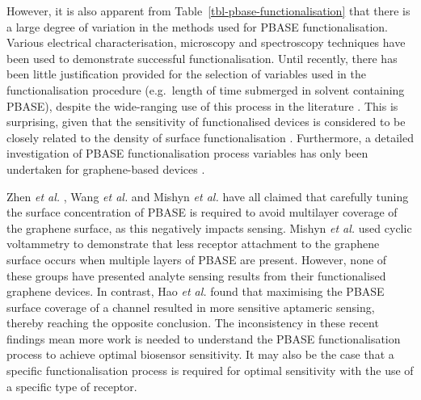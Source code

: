 \documentclass[
  a4paper,
]{scrbook}
\begin{document}
However, it is also apparent from
Table~\ref{tbl-pbase-functionalisation} that there is a large degree of
variation in the methods used for PBASE functionalisation. Various
electrical characterisation, microscopy and spectroscopy techniques have
been used to demonstrate successful functionalisation. Until recently,
there has been little justification provided for the selection of
variables used in the functionalisation procedure (e.g.~length of time
submerged in solvent containing PBASE), despite the wide-ranging use of
this process in the literature \autocite{Hinnemo2017,Zhen2018,Wang2020}.
This is surprising, given that the sensitivity of functionalised devices
is considered to be closely related to the density of surface
functionalisation \autocite{White2008,Hermanson2013-3,Chen2014}.
Furthermore, a detailed investigation of PBASE functionalisation process
variables has only been undertaken for graphene-based devices
\autocite{Zhen2018,Hao2020,Wang2020,Mishyn2022}.

Zhen \emph{et al.} \autocite{Zhen2018}, Wang \emph{et al.}
\autocite{Wang2020} and Mishyn \emph{et al.} \autocite{Mishyn2022} have
all claimed that carefully tuning the surface concentration of PBASE is
required to avoid multilayer coverage of the graphene surface, as this
negatively impacts sensing. Mishyn \emph{et al.} \autocite{Mishyn2022}
used cyclic voltammetry to demonstrate that less receptor attachment to
the graphene surface occurs when multiple layers of PBASE are present.
However, none of these groups have presented analyte sensing results
from their functionalised graphene devices. In contrast, Hao \emph{et
al.} \autocite{Hao2020} found that maximising the PBASE surface coverage
of a channel resulted in more sensitive aptameric sensing, thereby
reaching the opposite conclusion. The inconsistency in these recent
findings mean more work is needed to understand the PBASE
functionalisation process to achieve optimal biosensor sensitivity. It
may also be the case that a specific functionalisation process is
required for optimal sensitivity with the use of a specific type of
receptor.
\end{document}
